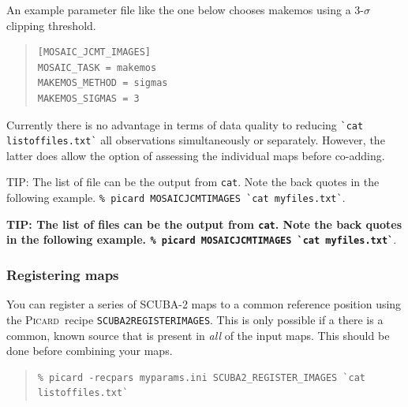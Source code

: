 \documentclass[twoside,11pt]{article}
\newenvironment{latexonly}{}{}
\newcommand{\xref}[3]{#1}
\renewcommand{\_}{\texttt{\symbol{95}}}
\newenvironment{fmpage}[1]{\begin{lrbox}{\fmbox}\begin{minipage}{#1}}{\end{minipage}\end{lrbox}\fbox{\usebox{\fmbox}}}
\newenvironment{myquote}{\begin{quote}\begin{small}}{\end{small}\end{quote}}
\newcommand{\picard}{\xref{\textsc{Picard}}{sun265}{}}
\newcommand{\drrecipe}[1]{\texttt{#1}}
\newcommand{\task}[1]{\textsf{#1}}
\begin{document}
An example parameter file like the one below chooses \task{makemos}
using a 3-$\sigma$ clipping threshold.

\begin{myquote}
\begin{verbatim}
[MOSAIC_JCMT_IMAGES]
MOSAIC_TASK = makemos
MAKEMOS_METHOD = sigmas
MAKEMOS_SIGMAS = 3
\end{verbatim}
\end{myquote}

Currently there is no advantage in terms of data quality to reducing
\texttt{\`{}cat listoffiles.txt\`{}}
all observations simultaneously or separately. However, the latter
does allow the option of assessing the individual maps before co-adding.

\begin{latexonly}
\begin{center}
\begin{fmpage}{0.95\linewidth}
\vspace{0.1cm}

TIP: The list of file can be the output from \texttt{cat}. Note the back quotes in
the following example.
\newline\texttt{\% picard MOSAIC\_JCMT\_IMAGES \`{}cat myfiles.txt\`{}}.
\vspace{0.1cm}
\end{fmpage}
\end{center}
\end{latexonly}

\begin{htmlonly}
\textbf{TIP: The list of files can be the output from \texttt{cat}. Note the
back quotes in the following example.
\texttt{\% picard MOSAIC\_JCMT\_IMAGES \`{}cat myfiles.txt\`{}}}.
\end{htmlonly}

\subsubsection{Registering maps}

You can register a series of SCUBA-2 maps to a common reference
position using the \picard\ recipe
\xref{\drrecipe{SCUBA2\_REGISTER\_IMAGES}}{sun265}{SCUBA2\_REGISTER\_IMAGES}.
This is only possible if a there is a common, known source that is
present in \textit{all} of the input maps. This should be done before
combining your maps.
\begin{myquote}
\begin{verbatim}
% picard -recpars myparams.ini SCUBA2_REGISTER_IMAGES `cat listoffiles.txt`
\end{verbatim}
\end{myquote}
\end{document}
